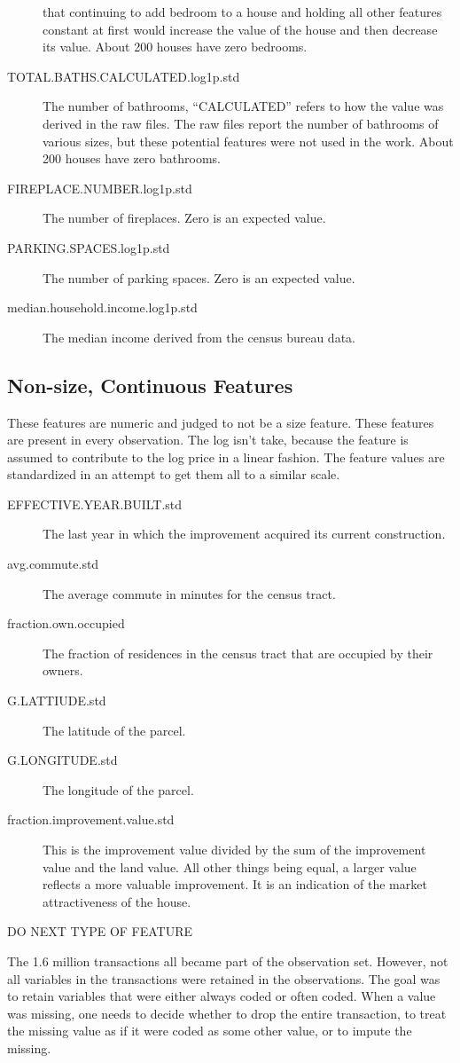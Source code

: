 \begin{description}
  that continuing to add bedroom to a house and holding all other
  features constant at first would increase the value of the house and
  then decrease its value. About 200 houses have zero bedrooms.
\item[TOTAL.BATHS.CALCULATED.log1p.std] The number of bathrooms,
  ``CALCULATED'' refers to how the value was derived in the raw
  files. The raw files report the number of bathrooms of various
  sizes, but these potential features were not used in the work. About
  200 houses have zero bathrooms.
\item[FIREPLACE.NUMBER.log1p.std] The number of fireplaces. Zero is an expected
  value.
\item[PARKING.SPACES.log1p.std] The number of parking spaces. Zero is an
  expected value.
\item[median.household.income.log1p.std] The median income derived from the
  census bureau data.
\end{description}

\subsection{Non-size, Continuous Features}

These features are numeric and judged to not be a size feature. These
features are present in every observation. The log isn't take, because
the feature is assumed to contribute to the log price in a linear
fashion. The feature values are standardized in an attempt to get them
all to a similar scale.
\begin{description}
\item[EFFECTIVE.YEAR.BUILT.std] The last year in which the improvement
  acquired its current construction.
\item[avg.commute.std] The average commute in minutes for the census tract.
\item[fraction.own.occupied] The fraction of residences in the census
  tract that are occupied by their owners.
\item[G.LATTIUDE.std] The latitude of the parcel.
\item[G.LONGITUDE.std] The longitude of the parcel.
\item[fraction.improvement.value.std] This is the improvement value
  divided by the sum of the improvement value and the land value. All
  other things being equal, a larger value reflects a more valuable
  improvement. It is an indication of the market attractiveness of the
  house.
\end{description}




DO NEXT TYPE OF FEATURE

The 1.6 million transactions all became part of the observation
set. However, not all variables in the transactions were retained in
the observations. The goal was to retain variables that were either
always coded or often coded. When a value was missing, one needs to
decide whether to drop the entire transaction, to treat the missing
value as if it were coded as some other value, or to impute the
missing.


 
